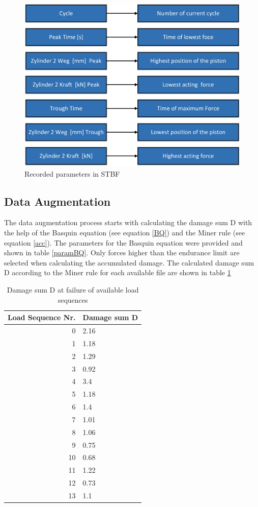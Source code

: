 \begin{figure}[H]
	\centering
	\includegraphics[width=0.75\linewidth]{IMGs/recordinglabel.png}
	\caption{Recorded parameters in STBF}
	\label{fig:recordinglabel}
\end{figure}

\subsection{Data Augmentation}
The data augmentation process starts with calculating the damage sum D with the help of the Basquin equation (see equation \ref{BQ}) and the Miner rule (see equation \ref{acc}).
The parameters for the Basquin equation were provided and shown in table \ref{paramBQ}.
Only forces higher than the endurance limit are selected when calculating the accumulated damage. The calculated damage sum D according to the Miner rule for each available file are shown in table \ref{DamageSUMS}


\begin{table}
	\begin{center}
		\begin{tabular}{|| r | l ||}
			\hline
			\rule{0pt}{2ex}Load Sequence Nr. & Damage sum D\\
			\hline
			\hline
			\rule{0pt}{2ex}0 & 2.16\\ \hline
			1 & 1.18\\	\hline
			2 & 1.29 \\ \hline
			3 & 0.92\\ \hline
			4 & 3.4 \\ \hline
			5 & 1.18 \\ \hline
			6 & 1.4 \\ \hline
			7 & 1.01 \\ \hline
			8 & 1.06 \\ \hline
			9 & 0.75 \\ \hline
			10 & 0.68 \\ \hline
			11 & 1.22\\ \hline
			12 & 0.73 \\ \hline
			13 & 1.1 \\ \hline

		\end{tabular}
		\caption{Damage sum D at failure of available load sequences}
		\label{DamageSUMS}
	\end{center}
	\vspace{-4mm}
\end{table}


